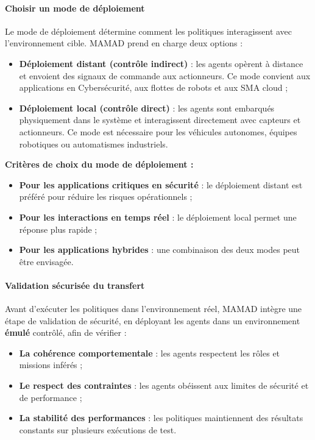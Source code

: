 \paragraph{Choisir un mode de déploiement}

Le mode de déploiement détermine comment les politiques interagissent avec l'environnement cible. MAMAD prend en charge deux options :

\begin{itemize}
    \item \textbf{Déploiement distant (contrôle indirect)} : les agents opèrent à distance et envoient des signaux de commande aux actionneurs. Ce mode convient aux applications en Cybersécurité, aux flottes de robots et aux SMA cloud ;
          
    \item \textbf{Déploiement local (contrôle direct)} : les agents sont embarqués physiquement dans le système et interagissent directement avec capteurs et actionneurs. Ce mode est nécessaire pour les véhicules autonomes, équipes robotiques ou automatismes industriels.
\end{itemize}

\vspace{0.4em}
\noindent \textbf{Critères de choix du mode de déploiement :}
\begin{itemize}
    \item \textbf{Pour les applications critiques en sécurité} : le déploiement distant est préféré pour réduire les risques opérationnels ;
    \item \textbf{Pour les interactions en temps réel} : le déploiement local permet une réponse plus rapide ;
    \item \textbf{Pour les applications hybrides} : une combinaison des deux modes peut être envisagée.
\end{itemize}

\paragraph{Validation sécurisée du transfert}

Avant d'exécuter les politiques dans l'environnement réel, MAMAD intègre une étape de validation de sécurité, en déployant les agents dans un environnement \textbf{émulé} contrôlé, afin de vérifier :

\begin{itemize}
    \item \textbf{La cohérence comportementale} : les agents respectent les rôles et missions inférés ;
    \item \textbf{Le respect des contraintes} : les agents obéissent aux limites de sécurité et de performance ;
    \item \textbf{La stabilité des performances} : les politiques maintiennent des résultats constants sur plusieurs exécutions de test.
\end{itemize}

